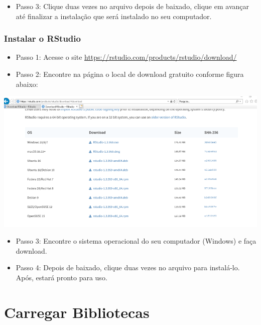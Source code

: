 \documentclass[
]{book}
\providecommand{\tightlist}{%
  \setlength{\itemsep}{0pt}\setlength{\parskip}{0pt}}
\begin{document}
\begin{itemize}
\tightlist
\item
  Passo 3: Clique duas vezes no arquivo depois de baixado, clique em avançar até finalizar a instalação que será instalado no seu computador.
\end{itemize}

\hypertarget{instalar-o-rstudio-2}{%
\subsection{Instalar o RStudio}\label{instalar-o-rstudio-2}}

\begin{itemize}
\tightlist
\item
  Passo 1: Acesse o site \url{https://rstudio.com/products/rstudio/download/}\\
\item
  Passo 2: Encontre na página o local de download gratuito conforme figura abaixo:
\end{itemize}

\includegraphics[width=13.54in]{img/inst_1_rstudio}

\begin{itemize}
\tightlist
\item
  Passo 3: Encontre o sistema operacional do seu computador (Windows) e faça download.
\item
  Passo 4: Depois de baixado, clique duas vezes no arquivo para instalá-lo. Após, estará pronto para uso.
\end{itemize}

\hypertarget{carregar-bibliotecas}{%
\chapter{Carregar Bibliotecas}\label{carregar-bibliotecas}}
\end{document}
